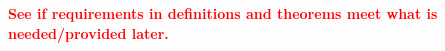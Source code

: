 \textbf{\textcolor{red}{See if requirements in definitions and theorems meet what is needed/provided later.}} \\





